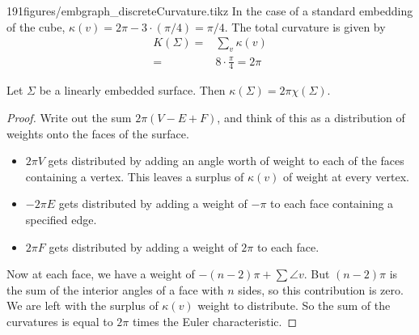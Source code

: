 \begin{examplefigureenv}{191figures/embgraph_discreteCurvature.tikz}
In the case of a standard embedding of the cube, $\kappa(v)=2\pi - 3\cdot (\pi/4)= \pi/4$. The total curvature is given by 
\begin{align*}
K(\Sigma)=&\sum_v \kappa(v)\\
=& 8 \cdot \frac{\pi}{4}=2\pi
\end{align*}
\end{examplefigureenv} 
\begin{theorem}
Let $\Sigma$ be a linearly embedded surface. Then $\kappa(\Sigma)=2\pi\chi(\Sigma)$.
\end{theorem}
\begin{proof}
Write out the sum $2\pi(V-E+F)$, and think of this as a distribution of weights onto the faces of the surface.
\begin{itemize}
\item $2\pi V$ gets distributed by adding an angle worth of weight to each of the faces containing a vertex. This leaves a surplus of $\kappa(v)$ of weight at every vertex.
\item $-2\pi E$ gets distributed by adding a weight of $-\pi$ to each face containing a specified edge.
\item $2\pi F$ gets distributed by adding a weight of $2\pi$ to each face.
\end{itemize}
Now at each face, we have a weight of $-(n-2)\pi+\sum \angle v$. But $(n-2)\pi$ is the sum of the interior angles of a face with $n$ sides, so this contribution is zero. We are left with the surplus of $\kappa(v)$ weight to distribute. So the sum of the curvatures is equal to $2\pi$ times the Euler characteristic. 
\end{proof}


